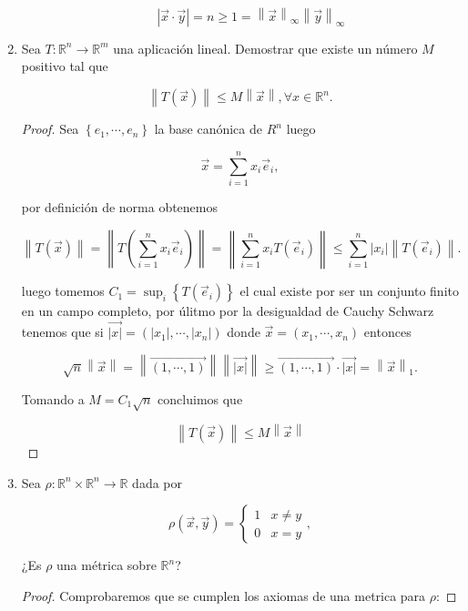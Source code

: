 \documentclass[letterpaper]{article}
\theoremstyle{definition}
\theoremstyle{lemathm}
\theoremstyle{lemathm}
\theoremstyle{lemathm}
\theoremstyle{lemademthm}
\newcommand{\abs}[1]{\left| #1 \right| }
\newcommand{\pars}[1]{\left( #1 \right) }
\newcommand{\norm}[1]{\left\lVert#1\right\rVert}
\newcommand{\set}[1]{\left \{ #1 \right\} }
\newcommand{\RR}{\mathbb{R}}
\newcommand{\1}{\mathbbm{1}}
\begin{document}
\begin{enumerate}
\begin{enumerate}
			\[\abs{\vec{x}\cdot\vec{y}} = n \geq 1 = \norm{\vec{x}}_{\infty} \norm{\vec{y}}_{\infty}\]
		\end{enumerate}

		\item Sea $T:\RR^n\to\RR^m$ una aplicación lineal. Demostrar que existe un número $M$ positivo tal que
		
		\[\norm{T\pars{\vec{x}}} \leq M \norm{\vec{x}}, \forall x\in\RR^n.\]

		\begin{proof}
			Sea $\set{e_1,\cdots,e_n}$ la base canónica de $R^n$ luego

			\[\vec{x} = \sum_{i=1}^n x_i\vec{e}_i,\]

			por definición de norma obtenemos

			\[\norm{T\pars{\vec{x}}} = \norm{T\pars{\sum_{i=1}^n x_i\vec{e}_i}} = \norm{\sum_{i=1}^n x_i T\pars{\vec{e}_i}} \leq \sum_{i=1}^n \abs{x_i}\norm{T\pars{\vec{e}_i}}.\]

			luego tomemos $C_1 = \sup_i\set{T\pars{\vec{e}_i}}$ el cual existe por ser un conjunto finito en un campo completo, por úlitmo por la desigualdad de Cauchy Schwarz tenemos que si $\vec{\abs{x}} = \pars{\abs{x_1},\cdots,\abs{x_n}}$ donde $\vec{x} = \pars{x_1,\cdots,x_n}$ entonces
			
			\[\sqrt{n} \norm{\vec{x}} = \norm{\vec{\pars{1,\cdots,1}}} \norm{\vec{\abs{x}}} \geq \vec{\pars{1,\cdots,1}}\cdot\vec{\abs{x}} = \norm{\vec{x}}_1.\]

			Tomando a $M = C_1\sqrt{n}$ concluimos que

			\[\norm{T\pars{\vec{x}}} \leq M\norm{\vec{x}}\]
		\end{proof}

		\item Sea $\rho:\RR^n\times\RR^n\to\RR$ dada por
		
		\[\rho\pars{\vec{x},\vec{y}} = \begin{cases}
			1 & x \neq y\\
			0 & x = y
		\end{cases},\]

		¿Es $\rho$ una métrica sobre $\RR^n$?

		\begin{proof}
			Comprobaremos que se cumplen los axiomas de una metrica para $\rho$:


\end{proof}
\end{enumerate}
\end{document}
